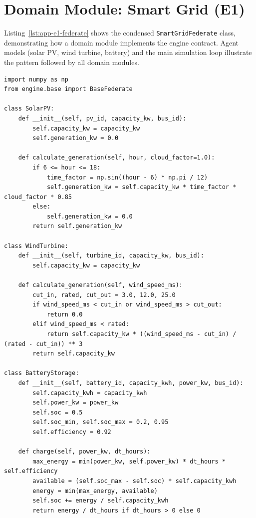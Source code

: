 \section{Domain Module: Smart Grid (E1)}
\label{sec:code-e1}

Listing~\ref{lst:app-e1-federate} shows the condensed \texttt{SmartGridFederate} class, demonstrating how a domain module implements the engine contract. Agent models (solar PV, wind turbine, battery) and the main simulation loop illustrate the pattern followed by all domain modules.

\begin{listing}[H]
\begin{verbatim}
import numpy as np
from engine.base import BaseFederate

class SolarPV:
    def __init__(self, pv_id, capacity_kw, bus_id):
        self.capacity_kw = capacity_kw
        self.generation_kw = 0.0

    def calculate_generation(self, hour, cloud_factor=1.0):
        if 6 <= hour <= 18:
            time_factor = np.sin((hour - 6) * np.pi / 12)
            self.generation_kw = self.capacity_kw * time_factor * cloud_factor * 0.85
        else:
            self.generation_kw = 0.0
        return self.generation_kw

class WindTurbine:
    def __init__(self, turbine_id, capacity_kw, bus_id):
        self.capacity_kw = capacity_kw

    def calculate_generation(self, wind_speed_ms):
        cut_in, rated, cut_out = 3.0, 12.0, 25.0
        if wind_speed_ms < cut_in or wind_speed_ms > cut_out:
            return 0.0
        elif wind_speed_ms < rated:
            return self.capacity_kw * ((wind_speed_ms - cut_in) / (rated - cut_in)) ** 3
        return self.capacity_kw

class BatteryStorage:
    def __init__(self, battery_id, capacity_kwh, power_kw, bus_id):
        self.capacity_kwh = capacity_kwh
        self.power_kw = power_kw
        self.soc = 0.5
        self.soc_min, self.soc_max = 0.2, 0.95
        self.efficiency = 0.92

    def charge(self, power_kw, dt_hours):
        max_energy = min(power_kw, self.power_kw) * dt_hours * self.efficiency
        available = (self.soc_max - self.soc) * self.capacity_kwh
        energy = min(max_energy, available)
        self.soc += energy / self.capacity_kwh
        return energy / dt_hours if dt_hours > 0 else 0


\end{verbatim}
\end{listing}
